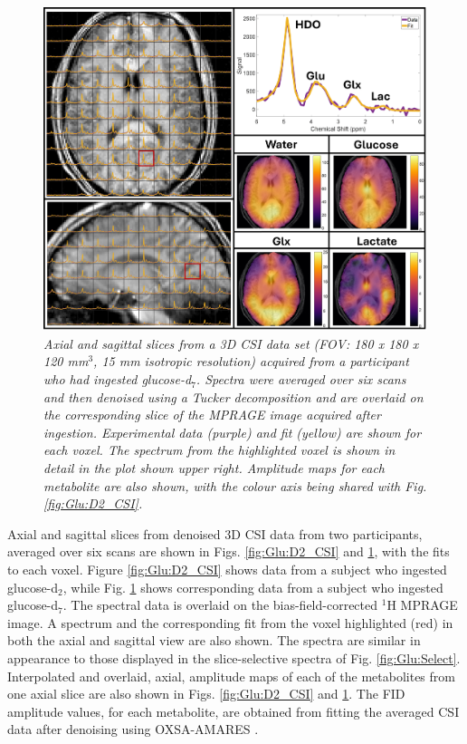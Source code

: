 \begin{figure}
    \centering
    \includegraphics[width = 1\textwidth]{Figures/Glucose/D7_CSI.png}
    \caption{\textit{Axial and sagittal slices from a 3D \ac{CSI} data set (\ac{FOV}: 180 {\normalfont x} 180 {\normalfont x} 120 mm$^3$, 15 mm isotropic resolution) acquired from a participant who had ingested glucose-d$_7$. Spectra were averaged over six scans and then denoised using a Tucker decomposition and are overlaid on the corresponding slice of the \ac{MPRAGE} image acquired after ingestion. Experimental data (purple) and fit (yellow) are shown for each voxel. The spectrum from the highlighted voxel is shown in detail in the plot shown upper right. Amplitude maps for each metabolite are also shown, with the colour axis being shared with Fig. \ref{fig:Glu:D2_CSI}.}}
    \label{fig:Glu:D7_CSI}
\end{figure}

Axial and sagittal slices from denoised 3D \ac{CSI} data from two participants, averaged over six scans are shown in Figs. \ref{fig:Glu:D2_CSI} and \ref{fig:Glu:D7_CSI}, with the fits to each voxel. Figure \ref{fig:Glu:D2_CSI} shows data from a subject who ingested glucose-d$_2$, while Fig. \ref{fig:Glu:D7_CSI} shows corresponding data from a subject who ingested glucose-d$_7$. The spectral data is overlaid on the bias-field-corrected $^1$H \ac{MPRAGE} image. A spectrum and the corresponding fit from the voxel highlighted (red) in both the axial and sagittal view are also shown. The spectra are similar in appearance to those displayed in the slice-selective spectra of Fig. \ref{fig:Glu:Select}. Interpolated and overlaid, axial, amplitude maps of each of the metabolites from one axial slice are also shown in Figs. \ref{fig:Glu:D2_CSI} and \ref{fig:Glu:D7_CSI}. The \ac{FID} amplitude values, for each metabolite, are obtained from fitting the averaged \ac{CSI} data after denoising using OXSA-AMARES \cite{Vanhamme1997ImprovedKnowledge, Purvis2017OXSA:MATLAB}.

